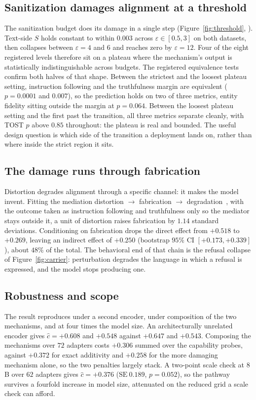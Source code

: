 \subsection{\label{sec:cliff}Sanitization damages alignment at a threshold}
The sanitization budget does its damage in a single step (Figure~\ref{fig:threshold}, ).
Text-side $S$ holds constant to within $0.003$ across $\varepsilon \in [0.5, 3]$ on both datasets,
then collapses between $\varepsilon = 4$ and $6$ and reaches zero by $\varepsilon = 12$.
Four of the eight registered levels therefore sit on a plateau where the mechanism's output is statistically indistinguishable across budgets.
The registered equivalence tests confirm both halves of that shape.
Between the strictest and the loosest plateau setting,
instruction following and the truthfulness margin are equivalent ($p = 0.0001$ and $0.007$),
so the prediction holds on two of three metrics,
entity fidelity sitting outside the margin at $p = 0.064$.
Between the loosest plateau setting and the first past the transition,
all three metrics separate cleanly,
with TOST $p$ above $0.85$ throughout:
the plateau is real and bounded.
The useful design question is which side of the transition a deployment lands on,
rather than where inside the strict region it sits.

\subsection{\label{sec:mediation}The damage runs through fabrication}
Distortion degrades alignment through a specific channel:
it makes the model invent.
Fitting the mediation distortion $\to$ fabrication $\to$ degradation~\citep{imai2010general},
with the outcome taken as instruction following and truthfulness only so the mediator stays outside it,
a unit of distortion raises fabrication by $1.14$ standard deviations.
Conditioning on fabrication drops the direct effect from $+0.518$ to $+0.269$,
leaving an indirect effect of $+0.250$ (bootstrap $95\%$ CI $[+0.173, +0.339]$),
about $48\%$ of the total.
The behavioral end of that chain is the refusal collapse of Figure~\ref{fig:carrier}:
perturbation degrades the language in which a refusal is expressed,
and the model stops producing one.

\subsection{\label{sec:scope}Robustness and scope}
The result reproduces under a second encoder,
under composition of the two mechanisms,
and at four times the model size.
An architecturally unrelated encoder gives $\hat c = +0.608$ and $+0.548$ against $+0.647$ and $+0.543$.
Composing the mechanisms over $72$ adapters costs $+0.306$ summed over the capability probes,
against $+0.372$ for exact additivity and $+0.258$ for the more damaging mechanism alone,
so the two penalties largely stack.
A two-point scale check at $8$B over $62$ adapters gives $\hat c = +0.376$ ($\mathrm{SE}\ 0.189$, $p = 0.052$),
so the pathway survives a fourfold increase in model size,
attenuated on the reduced grid a scale check can afford.

